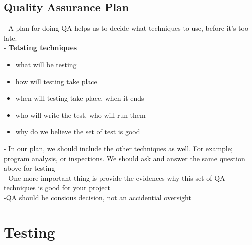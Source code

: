 \documentclass{article}
\begin{document}
 \subsection{Quality Assurance Plan}
  - A plan for doing QA helps us to decide what techniques to use, before it's
  too late. \\
  - \textbf{ Tetsting techniques}
  \begin{itemize}
    \item what will be testing
    \item how will testing take place
    \item when will testing take place, when it ends
    \item who will write the test, who will run them
    \item why do we believe the set of test is good
  \end{itemize}
  - In our plan, we should include the other techniques as well. For example;
  program analysis, or inspections. We should ask and answer the same question
  above for testing\\
  - One more important thing is provide the evidences why this set of QA
  techniques is good for your project\\
  -QA should be consious decision, not an accidential oversight
  
  
  \section{Testing}
\end{document}
